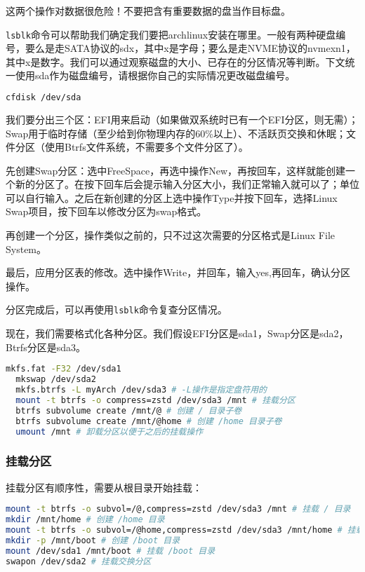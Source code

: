 \documentclass[../main.tex]{subfiles}
\begin{document}
这两个操作对数据很危险！不要把含有重要数据的盘当作目标盘。

\texttt{lsblk}命令可以帮助我们确定我们要把archlinux安装在哪里。一般有两种硬盘编号，要么是走SATA协议的sdx，其中x是字母；要么是走NVME协议的nvmexn1，其中x是数字。我们可以通过观察磁盘的大小、已存在的分区情况等判断。下文统一使用sda作为磁盘编号，请根据你自己的实际情况更改磁盘编号。

\begin{lstlisting}[language=bash]
  cfdisk /dev/sda
\end{lstlisting}

我们要分出三个区：EFI用来启动（如果做双系统时已有一个EFI分区，则无需）；Swap用于临时存储（至少给到你物理内存的60\%以上）、不活跃页交换和休眠；文件分区（使用Btrfs文件系统，不需要多个文件分区了）。

先创建Swap分区：选中FreeSpace，再选中操作New，再按回车，这样就能创建一个新的分区了。在按下回车后会提示输入分区大小，我们正常输入就可以了；单位可以自行输入。之后在新创建的分区上选中操作Type并按下回车，选择Linux Swap项目，按下回车以修改分区为swap格式。

再创建一个分区，操作类似之前的，只不过这次需要的分区格式是Linux File System。

最后，应用分区表的修改。选中操作Write，并回车，输入yes,再回车，确认分区操作。

分区完成后，可以再使用\texttt{lsblk}命令复查分区情况。

现在，我们需要格式化各种分区。我们假设EFI分区是sda1，Swap分区是sda2，Btrfs分区是sda3。

\begin{lstlisting}[language=bash]
  mkfs.fat -F32 /dev/sda1
  mkswap /dev/sda2
  mkfs.btrfs -L myArch /dev/sda3 # -L操作是指定盘符用的
  mount -t btrfs -o compress=zstd /dev/sda3 /mnt # 挂载分区
  btrfs subvolume create /mnt/@ # 创建 / 目录子卷
  btrfs subvolume create /mnt/@home # 创建 /home 目录子卷
  umount /mnt # 卸载分区以便于之后的挂载操作
\end{lstlisting}

\subsubsection{挂载分区}

挂载分区有顺序性，需要从根目录开始挂载：

\begin{lstlisting}[language=bash]
mount -t btrfs -o subvol=/@,compress=zstd /dev/sda3 /mnt # 挂载 / 目录
mkdir /mnt/home # 创建 /home 目录
mount -t btrfs -o subvol=/@home,compress=zstd /dev/sda3 /mnt/home # 挂载 /home 目录
mkdir -p /mnt/boot # 创建 /boot 目录
mount /dev/sda1 /mnt/boot # 挂载 /boot 目录
swapon /dev/sda2 # 挂载交换分区
\end{lstlisting}
\end{document}
